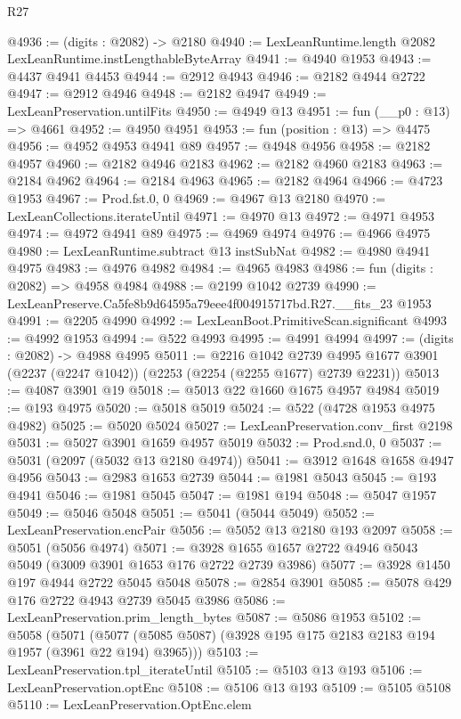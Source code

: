 \begin{lexlean}{R27}
\begin{coremodule}
@4936 := (digits : @2082) -> @2180
@4940 := LexLeanRuntime.length @2082 LexLeanRuntime.instLengthableByteArray
@4941 := @4940 @1953
@4943 := @4437 @4941 @4453
@4944 := @2912 @4943
@4946 := @2182 @4944 @2722
@4947 := @2912 @4946
@4948 := @2182 @4947
@4949 := LexLeanPreservation.untilFits
@4950 := @4949 @13
@4951 := fun (__p0 : @13) => @4661
@4952 := @4950 @4951
@4953 := fun (position : @13) => @4475
@4956 := @4952 @4953 @4941 @89
@4957 := @4948 @4956
@4958 := @2182 @4957
@4960 := @2182 @4946 @2183
@4962 := @2182 @4960 @2183
@4963 := @2184 @4962
@4964 := @2184 @4963
@4965 := @2182 @4964
@4966 := @4723 @1953
@4967 := Prod.fst.{0, 0}
@4969 := @4967 @13 @2180
@4970 := LexLeanCollections.iterateUntil
@4971 := @4970 @13
@4972 := @4971 @4953
@4974 := @4972 @4941 @89
@4975 := @4969 @4974
@4976 := @4966 @4975
@4980 := LexLeanRuntime.subtract @13 instSubNat
@4982 := @4980 @4941 @4975
@4983 := @4976 @4982
@4984 := @4965 @4983
@4986 := fun (digits : @2082) => @4958 @4984
@4988 := @2199 @1042 @2739
@4990 := LexLeanPreserve.Ca5fe8b9d64595a79eee4f004915717bd.R27.__fits_23 @1953
@4991 := @2205 @4990
@4992 := LexLeanBoot.PrimitiveScan.significant
@4993 := @4992 @1953
@4994 := @522 @4993
@4995 := @4991 @4994
@4997 := (digits : @2082) -> @4988 @4995
@5011 := @2216
    @1042
    @2739
    @4995
    @1677
    @3901
    (@2237 (@2247 @1042))
    (@2253 (@2254 (@2255 @1677) @2739 @2231))
@5013 := @4087 @3901 @19
@5018 := @5013 @22 @1660 @1675 @4957 @4984
@5019 := @193 @4975
@5020 := @5018 @5019
@5024 := @522 (@4728 @1953 @4975 @4982)
@5025 := @5020 @5024
@5027 := LexLeanPreservation.conv_first @2198
@5031 := @5027 @3901 @1659 @4957 @5019
@5032 := Prod.snd.{0, 0}
@5037 := @5031 (@2097 (@5032 @13 @2180 @4974))
@5041 := @3912 @1648 @1658 @4947 @4956
@5043 := @2983 @1653 @2739
@5044 := @1981 @5043
@5045 := @193 @4941
@5046 := @1981 @5045
@5047 := @1981 @194
@5048 := @5047 @1957
@5049 := @5046 @5048
@5051 := @5041 (@5044 @5049)
@5052 := LexLeanPreservation.encPair
@5056 := @5052 @13 @2180 @193 @2097
@5058 := @5051 (@5056 @4974)
@5071 := @3928 @1655 @1657 @2722 @4946 @5043 @5049 (@3009 @3901 @1653 @176 @2722 @2739 @3986)
@5077 := @3928 @1450 @197 @4944 @2722 @5045 @5048
@5078 := @2854 @3901
@5085 := @5078 @429 @176 @2722 @4943 @2739 @5045 @3986
@5086 := LexLeanPreservation.prim_length_bytes
@5087 := @5086 @1953
@5102 := @5058
    (@5071 (@5077 (@5085 @5087) (@3928 @195 @175 @2183 @2183 @194 @1957 (@3961 @22 @194) @3965)))
@5103 := LexLeanPreservation.tpl_iterateUntil
@5105 := @5103 @13 @193
@5106 := LexLeanPreservation.optEnc
@5108 := @5106 @13 @193
@5109 := @5105 @5108
@5110 := LexLeanPreservation.OptEnc.elem

\end{coremodule}
\end{lexlean}
